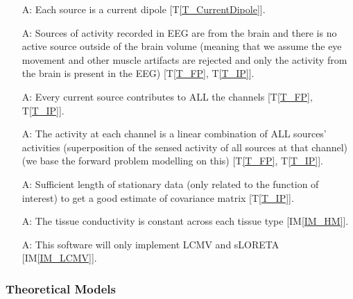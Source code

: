 \documentclass[12pt]{article}
\newcommand{\tref}[1]{T\ref{#1}}
\newcounter{assumpnum} %
\newcommand{\iref}[1]{IM\ref{#1}}
\begin{document}
\begin{itemize}

\item[A\refstepcounter{assumpnum}\theassumpnum \label{A_CD}:]
Each source is a current dipole [\tref{T_CurrentDipole}].
\item[A\refstepcounter{assumpnum}\theassumpnum \label{A_BrainOnly}:]
Sources of activity recorded in EEG are from the brain and there is no active source outside of the brain volume (meaning that we assume the eye movement and other muscle artifacts are rejected and only the activity from the brain is present in the EEG) [\tref{T_FP}, \tref{T_IP}].
\item[A\refstepcounter{assumpnum}\theassumpnum \label{A_AllChan}:]
Every current source contributes to ALL the channels [\tref{T_FP}, \tref{T_IP}].
\item[A\refstepcounter{assumpnum}\theassumpnum \label{A_SP}:] The activity at each channel is a linear combination of ALL sources' activities (superposition of the sensed activity of all sources at that channel) (we base the forward problem modelling on this)  [\tref{T_FP}, \tref{T_IP}].
\item[A\refstepcounter{assumpnum}\theassumpnum \label{A_SufData}:]Sufficient length of stationary data (only related to the function of interest) to get a good estimate of covariance matrix [\tref{T_IP}].
\item[A\refstepcounter{assumpnum}\theassumpnum \label{A_TC}:] The tissue conductivity is constant across each tissue type  [\iref{IM_HM}].
\item[A\refstepcounter{assumpnum}\theassumpnum \label{A_alg}:]  This software will only implement LCMV and sLORETA [\iref{IM_LCMV}].


\end{itemize}

\newpage
\subsubsection{Theoretical Models}\label{sec_theoretical}

\end{document}
